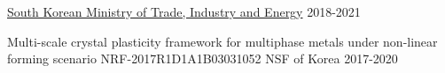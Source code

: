 \begin{cvhonors}

  \cvhonor
  {}
  {}
  {\href{http://www.motie.go.kr/www/main.do}{South Korean Ministry of Trade, Industry and Energy}}
  {2018-2021}

  \cvhonor
  {Multi-scale crystal plasticity framework for multiphase metals under non-linear forming scenario} %
  {NRF-2017R1D1A1B03031052}%
  {NSF of Korea} %
  {2017-2020} %

\end{cvhonors}